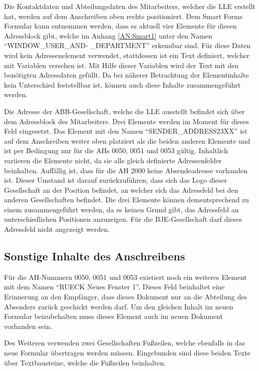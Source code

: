 	Die Kontaktdaten und Abteilungsdaten des Mitarbeiters, welcher die \ac{LLE} erstellt hat, werden auf dem Anschreiben oben rechts positioniert.
	Dem Smart Forms Formular kann entnommen werden, dass es aktuell vier Elemente für diesen Adressblock gibt, welche im Anhang \ref{AN:Smart1} unter den Namen "`WINDOW\_USER\_AND-
	\_DEPARTMENT"' erkennbar sind. Für diese Daten wird kein Adressenelement verwendet, stattdessen ist ein Text definiert, welcher mit Variablen versehen ist. Mit Hilfe dieser Variablen wird der Text mit den benötigten Adressdaten gefüllt. Da bei näherer Betrachtung der Elementinhalte kein Unterschied feststellbar ist, können auch diese Inhalte zusammengeführt werden.
	
	Die Adresse der ABB-Gesellschaft, welche die \ac{LLE} ausstellt befindet sich über dem Adressblock des Mitarbeiters. Drei Elemente werden im Moment für dieses Feld eingesetzt. Das Element mit den Namen "`SENDER\_ADDRESS23XX"' ist auf dem Anschreiben weiter oben platziert als die beiden anderen Elemente und ist per Bedingung nur für die \ac{AH}s 0050, 0051 und 0053 gültig. Inhaltlich variieren die Elemente nicht, da sie alle gleich definierte Adressenfelder beinhalten. Auffällig ist, dass für die \ac{AH} 2000 keine Absendeadresse vorhanden ist. Dieser Umstand ist darauf zurückzuführen, dass sich das Logo dieser Gesellschaft an der Position befindet, an welcher sich das Adressfeld bei den anderen Gesellschaften befindet. Die drei Elemente können dementsprechend zu einem zusammengeführt werden, da es keinen Grund gibt, das Adressfeld an unterschiedlichen Positionen anzuzeigen. Für die \ac{BJE}-Gesellschaft darf dieses Adressfeld nicht angezeigt werden.
	
	\subsection{Sonstige Inhalte des Anschreibens}
	\label{ist:rueck}
	
	Für die \ac{AH}-Nummern 0050, 0051 und 0053 existiert noch ein weiteres Element mit dem Namen "`RUECK Neues Fenster 1"'. Dieses Feld beinhaltet eine Erinnerung an den Empfänger, dass dieses Dokument nur an die Abteilung des Absenders zurück geschickt werden darf. Um den gleichen Inhalt im neuen Formular beizubehalten muss dieses Element auch im neuen Dokument vorhanden sein.
	
	Des Weiteren verwenden zwei Gesellschaften Fußzeilen, welche ebenfalls in das neue Formular übertragen werden müssen. Eingebunden sind diese beiden Texte über Textbausteine, welche die Fußzeilen beinhalten.
	
